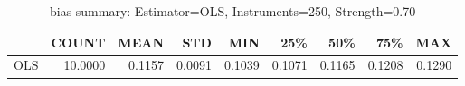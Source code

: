 \begin{table}[ht]
\centering
\caption{bias summary: Estimator=OLS, Instruments=250, Strength=0.70}
\begin{tabular}{lrrrrrrrr}
\toprule
 & COUNT & MEAN & STD & MIN & 25\% & 50\% & 75\% & MAX \\
\midrule
OLS & 10.0000 & 0.1157 & 0.0091 & 0.1039 & 0.1071 & 0.1165 & 0.1208 & 0.1290 \\
\bottomrule
\end{tabular}
\end{table}
